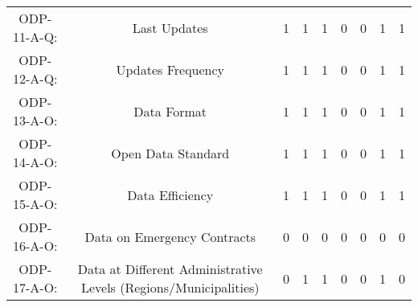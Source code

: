 \documentclass[a4paper, twoside]{report}
\begin{document}
\begin{table}[htbp]
\begin{adjustbox}{max width=\linewidth}
\begin{tabular}{rcccccccc}
    \midrule
    \multicolumn{1}{c}{ODP-11-A-Q:} & \multicolumn{1}{p{19em}}{\cellcolor[rgb]{ .749,  .749,  .749}Last Updates} & \cellcolor[rgb]{ .749,  .749,  .749}1 & \cellcolor[rgb]{ .749,  .749,  .749}1 & \cellcolor[rgb]{ .749,  .749,  .749}1 & \cellcolor[rgb]{ .749,  .749,  .749}0 & \cellcolor[rgb]{ .749,  .749,  .749}0 & \cellcolor[rgb]{ .749,  .749,  .749}1 & \cellcolor[rgb]{ .749,  .749,  .749}1 \\
    \multicolumn{1}{c}{ODP-12-A-Q:} & \multicolumn{1}{p{19em}}{\cellcolor[rgb]{ .749,  .749,  .749}Updates Frequency} & \cellcolor[rgb]{ .749,  .749,  .749}1 & \cellcolor[rgb]{ .749,  .749,  .749}1 & \cellcolor[rgb]{ .749,  .749,  .749}1 & \cellcolor[rgb]{ .749,  .749,  .749}0 & \cellcolor[rgb]{ .749,  .749,  .749}0 & \cellcolor[rgb]{ .749,  .749,  .749}1 & \cellcolor[rgb]{ .749,  .749,  .749}1 \\
    \midrule
    \multicolumn{1}{c}{ODP-13-A-O:} & \multicolumn{1}{p{19em}}{Data Format} & 1     & 1     & 1     & 0     & 0     & 1     & 1 \\
    \multicolumn{1}{c}{ODP-14-A-O:} & \multicolumn{1}{p{19em}}{\cellcolor[rgb]{ .749,  .749,  .749}Open Data Standard} & \cellcolor[rgb]{ .749,  .749,  .749}1 & \cellcolor[rgb]{ .749,  .749,  .749}1 & \cellcolor[rgb]{ .749,  .749,  .749}1 & \cellcolor[rgb]{ .749,  .749,  .749}0 & \cellcolor[rgb]{ .749,  .749,  .749}0 & \cellcolor[rgb]{ .749,  .749,  .749}1 & \cellcolor[rgb]{ .749,  .749,  .749}1 \\
    \multicolumn{1}{c}{ODP-15-A-O:} & \multicolumn{1}{p{19em}}{Data Efficiency} & 1     & 1     & 1     & 0     & 0     & 1     & 1 \\
    \multicolumn{1}{c}{ODP-16-A-O:} & \multicolumn{1}{p{19em}}{\cellcolor[rgb]{ .749,  .749,  .749}Data on Emergency Contracts} & \cellcolor[rgb]{ .749,  .749,  .749}0 & \cellcolor[rgb]{ .749,  .749,  .749}0 & \cellcolor[rgb]{ .749,  .749,  .749}0 & \cellcolor[rgb]{ .749,  .749,  .749}0 & \cellcolor[rgb]{ .749,  .749,  .749}0 & \cellcolor[rgb]{ .749,  .749,  .749}0 & \cellcolor[rgb]{ .749,  .749,  .749}0 \\
    \multicolumn{1}{c}{ODP-17-A-O:} & \multicolumn{1}{p{19em}}{\cellcolor[rgb]{ .749,  .749,  .749}Data at Different Administrative Levels (Regions/Municipalities)} & \cellcolor[rgb]{ .749,  .749,  .749}0 & \cellcolor[rgb]{ .749,  .749,  .749}1 & \cellcolor[rgb]{ .749,  .749,  .749}1 & \cellcolor[rgb]{ .749,  .749,  .749}0 & \cellcolor[rgb]{ .749,  .749,  .749}0 & \cellcolor[rgb]{ .749,  .749,  .749}1 & \cellcolor[rgb]{ .749,  .749,  .749}0 \\

\end{tabular}
\end{adjustbox}
\end{table}
\end{document}
